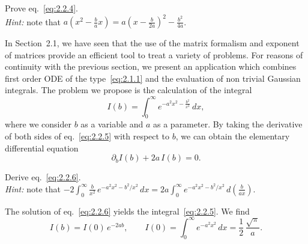\begin{exercise}
Prove eq.~\eqref{eq:2.2.4}.\\
\textit{Hint:} note that $a\!\left(x^{2}-\frac{b}{a}x\right)=a\!\left(x-\frac{b}{2a}\right)^{2}-\frac{b^{2}}{4a}$.
\end{exercise}

In Section~2.1, we have seen that the use of the matrix formalism and exponent of matrices provide an efficient tool to treat a variety of problems. For reasons of continuity with the previous section, we present an application which combines first order ODE of the type~\eqref{eq:2.1.1} and the evaluation of non trivial Gaussian integrals. The problem we propose is the calculation of the integral
\begin{equation}
I(b)=\int_{0}^{\infty}e^{-a^{2}x^{2}-\frac{b^{2}}{x^{2}}}\,dx,
\label{eq:2.2.5}
\end{equation}
where we consider $b$ as a variable and $a$ as a parameter. By taking the derivative of both sides of eq.~\eqref{eq:2.2.5} with respect to $b$, we can obtain the elementary differential equation
\begin{equation}
\partial_{b}I(b)+2a\,I(b)=0.
\label{eq:2.2.6}
\end{equation}

\begin{exercise}
Derive eq.~\eqref{eq:2.2.6}.\\
\textit{Hint:} note that
$-2\int_{0}^{\infty}\frac{b}{x^{2}}\,e^{-a^{2}x^{2}-b^{2}/x^{2}}\,dx
=2a\int_{0}^{\infty}e^{-a^{2}x^{2}-b^{2}/x^{2}}\,d\!\left(\frac{b}{ax}\right)$.
\end{exercise}

The solution of eq.~\eqref{eq:2.2.6} yields the integral~\eqref{eq:2.2.5}. We find
\begin{equation}
I(b)=I(0)\,e^{-2ab},\qquad
I(0)=\int_{0}^{\infty}e^{-a^{2}x^{2}}\,dx=\frac{1}{2}\,\frac{\sqrt{\pi}}{a}.
\label{eq:2.2.7}
\end{equation}

